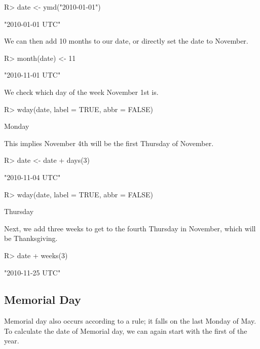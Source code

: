 \documentclass[article]{jss}
\begin{document}
\begin{CodeInput}
R> date <- ymd("2010-01-01")
\end{CodeInput}
\begin{CodeOutput}
[1] "2010-01-01 UTC"
\end{CodeOutput}

We can then add 10 months to our date, or directly set the date to November.

\begin{CodeInput}
R> month(date) <- 11
\end{CodeInput}
\begin{CodeOutput}
[1] "2010-11-01 UTC"
\end{CodeOutput}

We check which day of the week November 1st is.

\begin{CodeInput}
R> wday(date, label = TRUE, abbr = FALSE)
\end{CodeInput}
\begin{CodeOutput}
[1] Monday
\end{CodeOutput}

This implies November 4th will be the first Thursday of November.

\begin{CodeInput}
R> date <- date + days(3)
\end{CodeInput}
\begin{CodeOutput}
[1] "2010-11-04 UTC"
\end{CodeOutput}

\begin{CodeInput}
R> wday(date, label = TRUE, abbr = FALSE)
\end{CodeInput}
\begin{CodeOutput}
[1] Thursday
\end{CodeOutput}

Next, we add three weeks to get to the fourth Thursday in November, which will be Thanksgiving.

\begin{CodeInput}
R> date + weeks(3)
\end{CodeInput}
\begin{CodeOutput}
[1] "2010-11-25 UTC"
\end{CodeOutput}

\subsection{Memorial Day}
Memorial day also occurs according to a rule; it falls on the last Monday of May. To calculate the date of Memorial day, we can again start with the first of the year.
\end{document}
